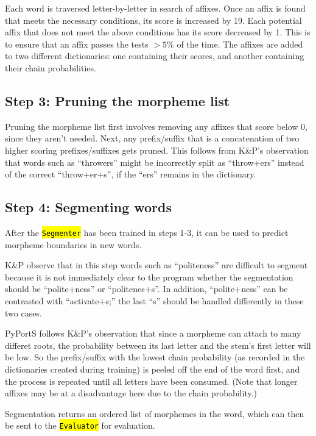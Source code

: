 \documentclass[paper=a4, fontsize=11pt]{article}
\newcommand{\hlc}[1]{\texttt{\hl{#1}}}
\begin{document}
Each word is traversed letter-by-letter in search of affixes. Once an affix is found that meets the necessary conditions, its score is increased by 19. Each potential affix that does not meet the above conditions has its score decreased by 1. This is to ensure that an affix passes the tests $>5\%$ of the time. The affixes are added to two different dictionaries: one containing their scores, and another containing their chain probabilities. 

\subsection{Step 3: Pruning the morpheme list}

Pruning the morpheme list first involves removing any affixes that score below 0, since they aren't needed. Next, any prefix/suffix that is a concatenation of two higher scoring prefixes/suffixes gets pruned. This follows from K\&P's observation that words such as ``throwers'' might be incorrectly split as ``throw+ers'' instead of the correct ``throw+er+s'', if the ``ers'' remains in the dictionary.

\subsection{Step 4: Segmenting words}

After the \hlc{Segmenter} has been trained in steps 1-3, it can be used to predict morpheme boundaries in new words. 

K\&P observe that in this step words such as ``politeness'' are difficult to segment because it is not immediately clear to the program whether the segmentation should be ``polite+ness'' or ``politenes+s''. In addition, ``polite+ness'' can be contrasted with ``activate+s;'' the last ``s'' should be handled differently in these two cases. 

PyPortS follows K\&P's observation that since a morpheme can attach to many differet roots, the probability between its last letter and the stem's first letter will be low. So the prefix/suffix with the lowest chain probability (as recorded in the dictionaries created during training) is peeled off the end of the word first, and the process is repeated until all letters have been consumed. (Note that longer affixes may be at a disadvantage here due to the chain probability.) 

Segmentation returns an ordered list of morphemes in the word, which can then be sent to the \hlc{Evaluator} for evaluation.
\end{document}
